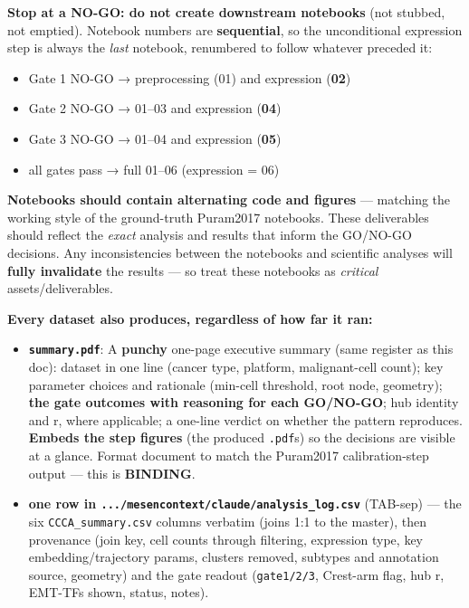 \documentclass[11pt,a4paper]{article}
\providecommand{\tightlist}{\setlength{\itemsep}{0pt}\setlength{\parskip}{0pt}}
\begin{document}
\textbf{Stop at a NO-GO: do not create downstream notebooks} (not
stubbed, not emptied). Notebook numbers are \textbf{sequential}, so the
unconditional expression step is always the \emph{last} notebook,
renumbered to follow whatever preceded it:

\begin{itemize}
\tightlist
\item
  Gate 1 NO-GO → preprocessing (01) and expression (\textbf{02})
\item
  Gate 2 NO-GO → 01--03 and expression (\textbf{04})
\item
  Gate 3 NO-GO → 01--04 and expression (\textbf{05})
\item
  all gates pass → full 01--06 (expression = 06)
\end{itemize}

\textbf{Notebooks should contain alternating code and figures} ---
matching the working style of the ground-truth Puram2017 notebooks.
These deliverables should reflect the \emph{exact} analysis and results
that inform the GO/NO-GO decisions. Any inconsistencies between the
notebooks and scientific analyses will \textbf{fully invalidate} the
results --- so treat these notebooks as \emph{critical}
assets/deliverables.

\textbf{Every dataset also produces, regardless of how far it ran:}

\begin{itemize}
\tightlist
\item
  \textbf{\texttt{summary.pdf}}: A \textbf{punchy} one-page executive
  summary (same register as this doc): dataset in one line (cancer type,
  platform, malignant-cell count); key parameter choices and rationale
  (min-cell threshold, root node, geometry); \textbf{the gate outcomes
  with reasoning for each GO/NO-GO}; hub identity and r, where
  applicable; a one-line verdict on whether the pattern reproduces.
  \textbf{Embeds the step figures} (the produced \texttt{.pdf}s) so the
  decisions are visible at a glance. Format document to match the
  Puram2017 calibration-step output --- this is \textbf{BINDING}.
\item
  \textbf{one row in \texttt{.../mesencontext/claude/analysis\_log.csv}}
  (TAB-sep) --- the six \texttt{CCCA\_summary.csv} columns verbatim
  (joins 1:1 to the master), then provenance (join key, cell counts
  through filtering, expression type, key embedding/trajectory params,
  clusters removed, subtypes and annotation source, geometry) and the gate
  readout (\texttt{gate1/2/3}, Crest-arm flag, hub r, EMT-TFs shown,
  status, notes).
\end{itemize}
\end{document}
